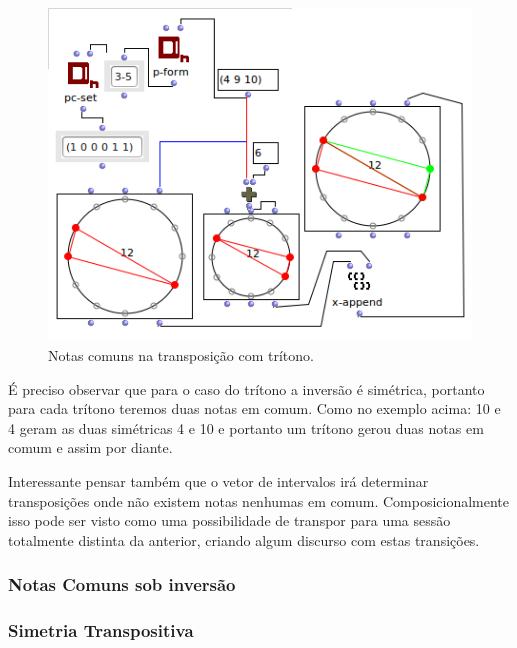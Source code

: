 \documentclass[
	12pt,				%
	openright,			%
	twoside,			%
	a4paper,			%
	english,			%
	french,				%
	spanish,			%
	brazil				%
	]{abntex2}
\begin{document}
\begin{figure}[!h]
	\caption{\label{fig_grafico}Notas comuns na transposição com trítono. }
	\begin{center}
	    \includegraphics[scale=0.7]{OM_settheory/notas_comuns_tritono.png}
	\end{center}
\end{figure}

É preciso observar que para o caso do trítono a inversão é simétrica, portanto para cada trítono teremos duas notas em comum. Como no exemplo acima: 10 e 4 geram as duas simétricas 4 e 10 e portanto um trítono gerou duas notas em comum e assim por diante.

Interessante pensar também que o vetor de intervalos irá determinar transposições onde não existem notas nenhumas em comum. Composicionalmente isso pode ser visto como uma possibilidade de transpor para uma sessão totalmente distinta da anterior, criando algum discurso com estas transições.













\subsubsection{Notas Comuns sob inversão}

\subsubsection{Simetria Transpositiva}
\end{document}
